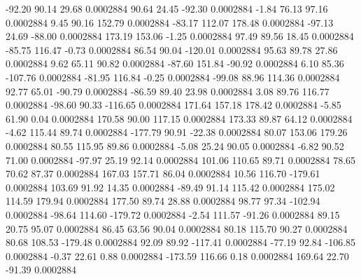       -92.20       90.14       29.68     0.0002884
       90.64       24.45      -92.30     0.0002884
       -1.84       76.13       97.16     0.0002884
        9.45       90.16      152.79     0.0002884
      -83.17      112.07      178.48     0.0002884
      -97.13       24.69      -88.00     0.0002884
      173.19      153.06       -1.25     0.0002884
       97.49       89.56       18.45     0.0002884
      -85.75      116.47       -0.73     0.0002884
       86.54       90.04     -120.01     0.0002884
       95.63       89.78       27.86     0.0002884
        9.62       65.11       90.82     0.0002884
      -87.60      151.84      -90.92     0.0002884
        6.10       85.36     -107.76     0.0002884
      -81.95      116.84       -0.25     0.0002884
      -99.08       88.96      114.36     0.0002884
       92.77       65.01      -90.79     0.0002884
      -86.59       89.40       23.98     0.0002884
        3.08       89.76      116.77     0.0002884
      -98.60       90.33     -116.65     0.0002884
      171.64      157.18      178.42     0.0002884
       -5.85       61.90        0.04     0.0002884
      170.58       90.00      117.15     0.0002884
      173.33       89.87       64.12     0.0002884
       -4.62      115.44       89.74     0.0002884
     -177.79       90.91      -22.38     0.0002884
       80.07      153.06      179.26     0.0002884
       80.55      115.95       89.86     0.0002884
       -5.08       25.24       90.05     0.0002884
       -6.82       90.52       71.00     0.0002884
      -97.97       25.19       92.14     0.0002884
      101.06      110.65       89.71     0.0002884
       78.65       70.62       87.37     0.0002884
      167.03      157.71       86.04     0.0002884
       10.56      116.70     -179.61     0.0002884
      103.69       91.92       14.35     0.0002884
      -89.49       91.14      115.42     0.0002884
      175.02      114.59      179.94     0.0002884
      177.50       89.74       28.88     0.0002884
       98.77       97.34     -102.94     0.0002884
      -98.64      114.60     -179.72     0.0002884
       -2.54      111.57      -91.26     0.0002884
       89.15       20.75       95.07     0.0002884
       86.45       63.56       90.04     0.0002884
       80.18      115.70       90.27     0.0002884
       80.68      108.53     -179.48     0.0002884
       92.09       89.92     -117.41     0.0002884
      -77.19       92.84     -106.85     0.0002884
       -0.37       22.61        0.88     0.0002884
     -173.59      116.66        0.18     0.0002884
      169.64       22.70      -91.39     0.0002884
